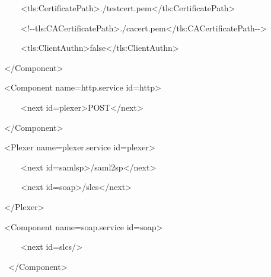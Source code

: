 \documentclass{article}
\begin{document}
{\ttfamily\color{black}
\ \ \ \ \ \ \ \ \ \ \ \ {\textless}tls:CertificatePath{\textgreater}./testcert.pem{\textless}/tls:CertificatePath{\textgreater}}

{\ttfamily\color{black}
\ \ \ \ \ \ \ \ \ \ \ \ {\textless}!-{}-tls:CACertificatePath{\textgreater}./cacert.pem{\textless}/tls:CACertificatePath-{}-{\textgreater}}

{\ttfamily\color{black}
\ \ \ \ \ \ \ \ \ \ \ \ {\textless}tls:ClientAuthn{\textgreater}false{\textless}/tls:ClientAuthn{\textgreater}}

{\ttfamily\color{black}
\ \ \ \ \ \ \ \ {\textless}/Component{\textgreater}}

{\ttfamily\color{black}
\ \ \ \ \ \ \ \ {\textless}Component
name={\textquotedbl}http.service{\textquotedbl}
id={\textquotedbl}http{\textquotedbl}{\textgreater}}

{\ttfamily\color{black}
\ \ \ \ \ \ \ \ \ \ \ \ {\textless}next
id={\textquotedbl}plexer{\textquotedbl}{\textgreater}POST{\textless}/next{\textgreater}}

{\ttfamily\color{black}
\ \ \ \ \ \ \ \ {\textless}/Component{\textgreater}}

{\ttfamily\color{black}
\ \ \ \ \ \ \ \ {\textless}Plexer
name={\textquotedbl}plexer.service{\textquotedbl}
id={\textquotedbl}plexer{\textquotedbl}{\textgreater}}

{\ttfamily\color{black}
\ \ \ \ \ \ \ \ \ \ \ \ {\textless}next
id={\textquotedbl}samlsp{\textquotedbl}{\textgreater}/saml2sp{\textless}/next{\textgreater}}

{\ttfamily\color{black}
\ \ \ \ \ \ \ \ \ \ \ \ {\textless}next
id={\textquotedbl}soap{\textquotedbl}{\textgreater}/slcs{\textless}/next{\textgreater}}

{\ttfamily\color{black}
\ \ \ \ \ \ \ \ {\textless}/Plexer{\textgreater}}

{\ttfamily\color{black}
\ \ \ \ \ \ \ \ {\textless}Component
name={\textquotedbl}soap.service{\textquotedbl}
id={\textquotedbl}soap{\textquotedbl}{\textgreater}}

{\ttfamily\color{black}
\ \ \ \ \ \ \ \ \ \ \ \ {\textless}next
id={\textquotedbl}slcs{\textquotedbl}/{\textgreater}}

{\ttfamily\color{black}
\ \ \ \ \ \ \ \ \ {\textless}/Component{\textgreater}}
\end{document}
